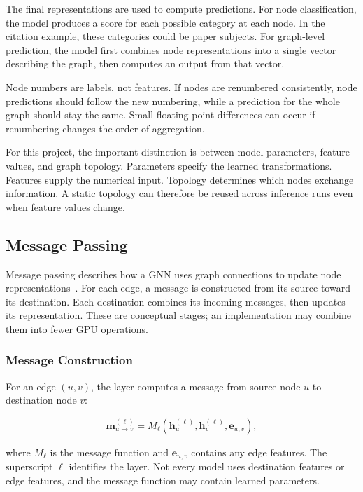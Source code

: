 The final representations are used to compute predictions. For node classification, the model produces a score for each possible category at each node. In the citation example, these categories could be paper subjects. For graph-level prediction, the model first combines node representations into a single vector describing the graph, then computes an output from that vector.

Node numbers are labels, not features. If nodes are renumbered consistently, node predictions should follow the new numbering, while a prediction for the whole graph should stay the same. Small floating-point differences can occur if renumbering changes the order of aggregation.

For this project, the important distinction is between model parameters, feature values, and graph topology. Parameters specify the learned transformations. Features supply the numerical input. Topology determines which nodes exchange information. A static topology can therefore be reused across inference runs even when feature values change.

\subsection{Message Passing}
\label{sec:message-passing}

Message passing describes how a GNN uses graph connections to update node representations~\cite{gilmerMessagePassing}. For each edge, a message is constructed from its source toward its destination. Each destination combines its incoming messages, then updates its representation. These are conceptual stages; an implementation may combine them into fewer GPU operations.

\subsubsection{Message Construction}

For an edge $(u,v)$, the layer computes a message from source node $u$ to destination node $v$:

\[
  \mathbf{m}_{u\rightarrow v}^{(\ell)}
  = M_\ell\left(\mathbf{h}_u^{(\ell)},\mathbf{h}_v^{(\ell)},\mathbf{e}_{u,v}\right),
\]

where $M_\ell$ is the message function and $\mathbf{e}_{u,v}$ contains any edge features. The superscript $\ell$ identifies the layer. Not every model uses destination features or edge features, and the message function may contain learned parameters.

